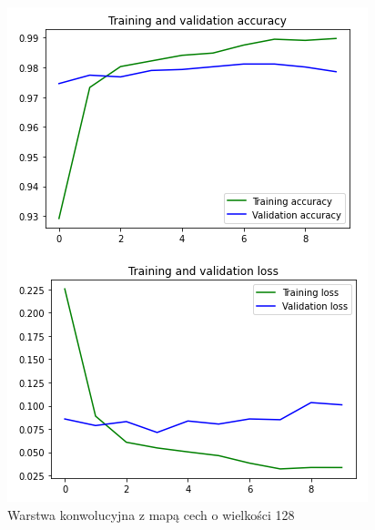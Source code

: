\documentclass{article}
\begin{document}
\begin{figure}[!htb]
  \centering
  \includegraphics[width=\linewidth]{feature_128.png}
  \caption{Warstwa konwolucyjna z mapą cech o wielkości 128}
\end{figure}
\end{document}
